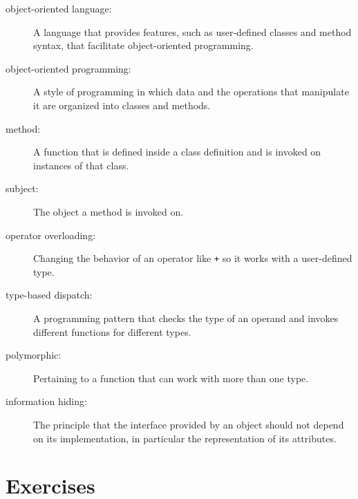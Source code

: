 \documentclass[12pt,a4paper,final,twoside,onecolumn,titlepage]{book}
\begin{document}
\begin{description}

\item[object-oriented language:] A language that provides features,
  such as user-defined classes and method syntax, that facilitate
  object-oriented programming.

\item[object-oriented programming:] A style of programming in which
data and the operations that manipulate it are organized into classes
and methods.

\item[method:] A function that is defined inside a class definition and
is invoked on instances of that class.

\item[subject:] The object a method is invoked on.

\item[operator overloading:] Changing the behavior of an operator like
{\tt +} so it works with a user-defined type.

\item[type-based dispatch:] A programming pattern that checks the type
of an operand and invokes different functions for different types.

\item[polymorphic:] Pertaining to a function that can work with more
  than one type.  

\item[information hiding:] The principle that the interface provided 
by an object should not depend on its implementation, in particular
the representation of its attributes.


\end{description}

\section{Exercises}
\end{document}
